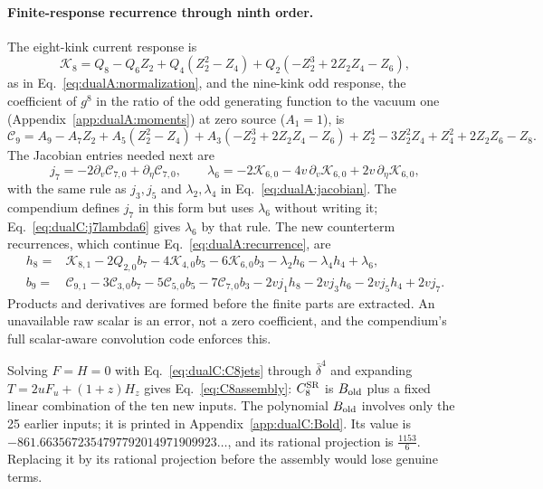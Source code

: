 \documentclass[11pt,a4paper]{article}
\numberwithin{equation}{section}
\newcommand{\CSR}{C^{\rm SR}}
\newcommand{\db}{\bar\delta}
\begin{document}
\paragraph{Finite-response recurrence through ninth order.} The eight-kink current response is
\begin{equation}
 \mathcal K_8=Q_8-Q_6Z_2+Q_4(Z_2^2-Z_4)+Q_2(-Z_2^3+2Z_2Z_4-Z_6),
 \label{eq:dualC:K8norm}
\end{equation}
as in Eq.~\eqref{eq:dualA:normalization}, and the nine-kink odd response, the coefficient of $g^8$ in the ratio of the
odd generating function to the vacuum one (Appendix~\ref{app:dualA:moments}) at zero source ($A_1=1$), is
\begin{equation}
 \mathcal C_9=A_9-A_7Z_2+A_5(Z_2^2-Z_4)+A_3(-Z_2^3+2Z_2Z_4-Z_6)+Z_2^4-3Z_2^2Z_4+Z_4^2+2Z_2Z_6-Z_8.
 \label{eq:dualC:C9norm}
\end{equation}
The Jacobian entries needed next are
\begin{equation}
 j_7=-2\partial_v\mathcal C_{7,0}+\partial_\eta\mathcal C_{7,0},\qquad
 \lambda_6=-2\mathcal K_{6,0}-4v\,\partial_v\mathcal K_{6,0}+2v\,\partial_\eta\mathcal K_{6,0},
 \label{eq:dualC:j7lambda6}
\end{equation}
with the same rule as $j_3,j_5$ and $\lambda_2,\lambda_4$ in Eq.~\eqref{eq:dualA:jacobian}. The compendium defines
$j_7$ in this form but uses $\lambda_6$ without writing it; Eq.~\eqref{eq:dualC:j7lambda6} gives $\lambda_6$ by that
rule. The new counterterm recurrences, which continue Eq.~\eqref{eq:dualA:recurrence}, are
\begin{equation}
\begin{aligned}
 h_8={}&\mathcal K_{8,1}-2Q_{2,0}b_7-4\mathcal K_{4,0}b_5-6\mathcal K_{6,0}b_3-\lambda_2h_6-\lambda_4h_4+\lambda_6,\\
 b_9={}&\mathcal C_{9,1}-3\mathcal C_{3,0}b_7-5\mathcal C_{5,0}b_5-7\mathcal C_{7,0}b_3
 -2vj_1h_8-2vj_3h_6-2vj_5h_4+2vj_7.
\end{aligned}
\label{eq:dualC:b9}
\end{equation}
Products and derivatives are formed before the finite parts are extracted. An unavailable raw scalar is an error, not a
zero coefficient, and the compendium's full scalar-aware convolution code enforces this.

Solving $F=H=0$ with Eq.~\eqref{eq:dualC:C8jets} through $\db^4$ and expanding $T=2uF_u+(1+z)H_z$ gives
Eq.~\eqref{eq:C8assembly}: $\CSR_8$ is $B_{\rm old}$ plus a fixed linear combination of the ten new inputs. The
polynomial $B_{\rm old}$ involves only the 25 earlier inputs; it is printed in Appendix~\ref{app:dualC:Bold}. Its value is
$-861.6635672354797792014971909923\ldots$, and its rational projection is $\frac{1153}{6}$. Replacing it by its
rational projection before the assembly would lose genuine terms.
\end{document}
